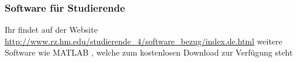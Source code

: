 \subsubsection{Software für Studierende} 
Ihr  findet auf der Website \url{http://www.rz.hm.edu/studierende\_4/software\_bezug/index.de.html} weitere Software wie MATLAB , welche zum kostenlosen 
Download zur Verfügung steht 